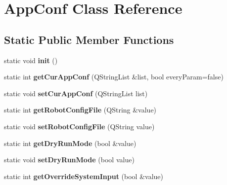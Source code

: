 \hypertarget{classAppConf}{\section{App\-Conf Class Reference}
\label{classAppConf}
}
\subsection*{Static Public Member Functions}
\begin{DoxyCompactItemize}
\item 
\hypertarget{classAppConf_a18354969a42830c125f2ab34dcc5fe5b}{static void {\bfseries init} ()}\label{classAppConf_a18354969a42830c125f2ab34dcc5fe5b}

\item 
\hypertarget{classAppConf_a75c6ca45ca72548229c201dc1abbe6aa}{static int {\bfseries get\-Cur\-App\-Conf} (Q\-String\-List \&list, bool every\-Param=false)}\label{classAppConf_a75c6ca45ca72548229c201dc1abbe6aa}

\item 
\hypertarget{classAppConf_a42619981cde5a6b807d1e93b5da69238}{static void {\bfseries set\-Cur\-App\-Conf} (Q\-String\-List list)}\label{classAppConf_a42619981cde5a6b807d1e93b5da69238}

\item 
\hypertarget{classAppConf_ad04553167deefc56e2661a82987054a3}{static int {\bfseries get\-Robot\-Config\-File} (Q\-String \&value)}\label{classAppConf_ad04553167deefc56e2661a82987054a3}

\item 
\hypertarget{classAppConf_a3668efc72f6ddc29cb47484ca76b0860}{static void {\bfseries set\-Robot\-Config\-File} (Q\-String value)}\label{classAppConf_a3668efc72f6ddc29cb47484ca76b0860}

\item 
\hypertarget{classAppConf_a02812f774c473aa12ca17f8390e39015}{static int {\bfseries get\-Dry\-Run\-Mode} (bool \&value)}\label{classAppConf_a02812f774c473aa12ca17f8390e39015}

\item 
\hypertarget{classAppConf_aac6e7b97bf16a215df49604aaaa963b1}{static void {\bfseries set\-Dry\-Run\-Mode} (bool value)}\label{classAppConf_aac6e7b97bf16a215df49604aaaa963b1}

\item 
\hypertarget{classAppConf_af2df571c1ca01e7e7df61be3fd7f112b}{static int {\bfseries get\-Override\-System\-Input} (bool \&value)}\label{classAppConf_af2df571c1ca01e7e7df61be3fd7f112b}


\end{DoxyCompactItemize}
